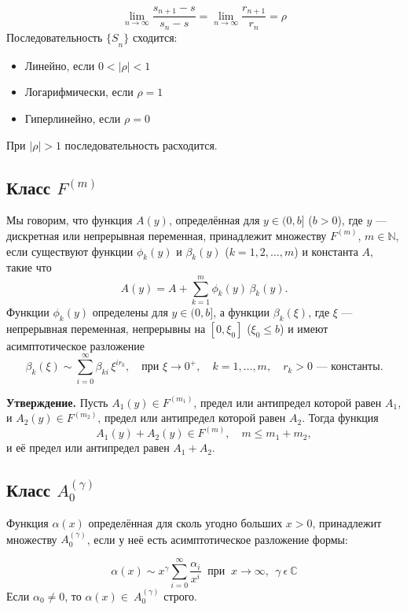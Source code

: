 \documentclass[14pt, a4paper]{extarticle}
\theoremstyle{definition}
\theoremstyle{remark}
\begin{document}
\[\lim_{n \rightarrow \infty}\frac{s_{n + 1} - s}{s_{n} - s} = \lim_{n \rightarrow \infty}\frac{r_{n + 1}}{r_{n}} = \rho\]
Последовательность \({\{ S}_{n}\}\) сходится:

\begin{itemize}
\item
  Линейно, если \(0 < |\rho| < 1\)
\item
  Логарифмически, если \(\rho = 1\)
\item
  Гиперлинейно, если \(\rho = 0\)
\end{itemize}

При \(|\rho| > 1\) последовательность расходится.

\subsection*{Класс \(F^{(m)}\)}

Мы говорим, что функция \(A(y)\), определённая для \(y \in (0,b]\) (\(b>0\)), где \(y\) — дискретная или непрерывная переменная, принадлежит множеству \(F^{(m)}\), \(m \in \mathbb{N}\), если существуют функции \(\phi_k(y)\) и \(\beta_k(y)\) (\(k=1,2,\dots,m\)) и константа \(A\), такие что
\[
A(y) = A + \sum_{k=1}^{m} \phi_k(y)\, \beta_k(y).
\]
Функции \(\phi_k(y)\) определены для \(y \in (0,b]\), а функции \(\beta_k(\xi)\), где \(\xi\) — непрерывная переменная, непрерывны на \([0,\xi_0]\) (\(\xi_0 \le b\)) и имеют асимптотическое разложение
\[
\beta_k(\xi) \sim \sum_{i=0}^{\infty} \beta_{ki}\, \xi^{i r_k}, \quad \text{при } \xi \to 0^+, \quad k=1,\dots,m, \quad r_k>0 \text{ — константы.}
\]

\textbf{Утверждение.} Пусть \(A_1(y) \in F^{(m_1)}\), предел или антипредел которой равен \(A_1\), и \(A_2(y) \in F^{(m_2)}\), предел или антипредел которой равен \(A_2\). Тогда функция
\[
A_1(y) + A_2(y) \in F^{(m)}, \quad m \le m_1 + m_2,
\]
и её предел или антипредел равен \(A_1 + A_2\).

\subsection*{Класс \(A_{0}^{(\gamma)}\)}

Функция $\alpha(x)$ определённая для сколь угодно больших $x > 0$,
принадлежит множеству \(A_{0}^{(\gamma)}\), если у неё есть
асимптотическое разложение формы:

\[\alpha(x)\sim x^{\gamma}\sum_{i = 0}^{\infty}\frac{\alpha_{i}}{x^{i}}\ \text{ при }\ x \rightarrow \infty,\ \ \gamma\ \epsilon\mathbb{\ C}\]
Если \(\alpha_{0} \neq 0\), то \(\alpha(x) \in \ A_{0}^{(\gamma)}\)
строго.
\end{document}
